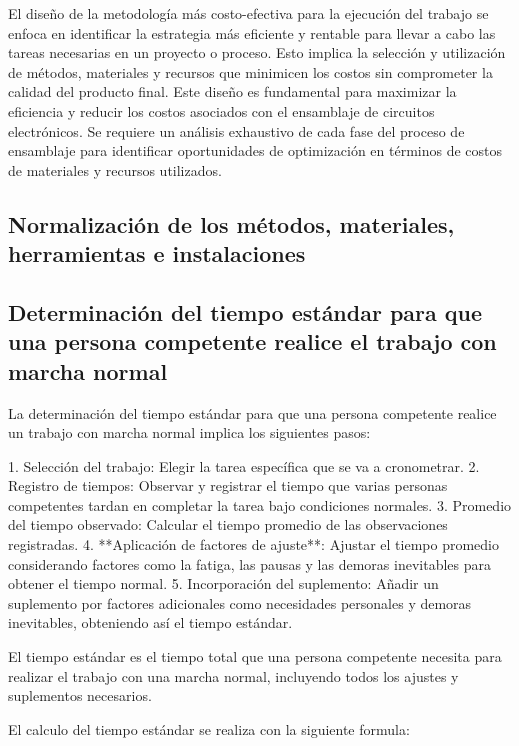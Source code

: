     El diseño de la metodología más costo-efectiva para la ejecución del trabajo se enfoca en identificar la estrategia más eficiente y rentable para llevar a cabo las tareas necesarias en un proyecto o proceso. Esto implica la selección y utilización de métodos, materiales y recursos que minimicen los costos sin comprometer la calidad del producto final. Este diseño es fundamental para maximizar la eficiencia y reducir los costos asociados con el ensamblaje de circuitos electrónicos. Se requiere un análisis exhaustivo de cada fase del proceso de ensamblaje para identificar oportunidades de optimización en términos de costos de materiales y recursos utilizados.
    \subsection{Normalización de los métodos, materiales, herramientas e instalaciones}
    
    \subsection{Determinación del tiempo estándar para que una persona competente realice el trabajo con marcha normal}
    
    La determinación del tiempo estándar para que una persona competente realice un trabajo con marcha normal implica los siguientes pasos:
    
    1. Selección del trabajo: Elegir la tarea específica que se va a cronometrar.
    2. Registro de tiempos: Observar y registrar el tiempo que varias personas competentes tardan en completar la tarea bajo condiciones normales.
    3. Promedio del tiempo observado: Calcular el tiempo promedio de las observaciones registradas.
    4. **Aplicación de factores de ajuste**: Ajustar el tiempo promedio considerando factores como la fatiga, las pausas y las demoras inevitables para obtener el tiempo normal.
    5. Incorporación del suplemento: Añadir un suplemento por factores adicionales como necesidades personales y demoras inevitables, obteniendo así el tiempo estándar.
    
    El tiempo estándar es el tiempo total que una persona competente necesita para realizar el trabajo con una marcha normal, incluyendo todos los ajustes y suplementos necesarios.
    
     El calculo del tiempo estándar se realiza con la siguiente formula: 
    
